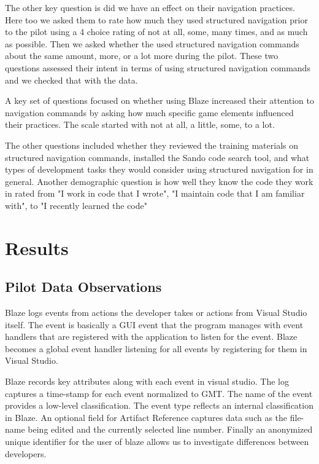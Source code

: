 \documentclass{sig-alternate}
\begin{document}
The other key question is did we have an effect on their navigation practices.  Here too we asked them to rate how much they used structured navigation prior to the pilot using a 4 choice rating of not at all, some, many times, and as much as possible.  Then we asked whether the used structured navigation commands about the same amount, more,  or a lot more during the pilot.  These two questions assessed their intent in terms of using structured navigation commands and we checked that with the data.

A key set of questions focused on whether using Blaze increased their attention to navigation commands by asking how much specific game elements influenced their practices.  The scale started with not at all, a little, some, to a lot.  

The other questions included whether they reviewed the training materials on structured navigation commands, installed the Sando code search tool, and what types of development tasks they would consider using structured navigation for in general.  Another demographic question is how well they know the code they work in rated from "I work in code that I wrote", "I maintain code that I am familiar with", to "I recently learned the code"

\section{Results}

\subsection{Pilot Data Observations}

Blaze logs events from actions the developer takes or actions from Visual Studio itself.
 The event is basically a GUI event that the program manages with event handlers that are registered with the application to listen for the event.  Blaze becomes a global event handler listening for all events by registering for them in Visual Studio.  

Blaze records key attributes along with each event in visual studio.  The log captures a time-stamp for each event normalized to GMT.  The name of the event provides a low-level classification.  The event type reflects an internal classification in Blaze.  An optional field for Artifact Reference captures data such as the file-name being edited and the currently selected line number.  Finally an anonymized unique identifier for the user of blaze allows us to investigate differences between developers.
\end{document}
